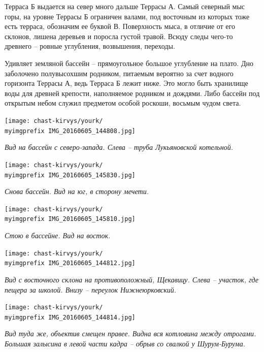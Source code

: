 Терраса Б выдается на север много дальше Террасы А. Самый северный мыс горы, на уровне Террасы Б ограничен валами, под восточным из которых тоже есть терраса, обозначим ее буквой В. Поверхность мыса, в отличие от его склонов, лишена деревьев и поросла густой травой. Всюду следы чего-то древнего – ровные углубления, возвышения, переходы.

Удивляет земляной бассейн – прямоугольное большое углубление на плато. Дно заболочено полувысохшим родником, питаемым вероятно за счет водного горизонта Террасы А, ведь Терраса Б лежит ниже. Это могло быть хранилище воды для древней крепости, наполняемое родником и дождями. Либо бассейн под открытым небом служил предметом особой роскоши, восьмым чудом света. 

\begin{center}
\texttt{[image: chast-kirvys/yourk/\\myimgprefix IMG\_20160605\_144808.jpg]}

\textit{Вид на бассейн с северо-запада. Слева – труба Лукьяновской котельной.}
\end{center}

\begin{center}
\texttt{[image: chast-kirvys/yourk/\\myimgprefix IMG\_20160605\_145830.jpg]}

\textit{Снова бассейн. Вид на юг, в сторону мечети.}
\end{center}

\begin{center}
\texttt{[image: chast-kirvys/yourk/\\myimgprefix IMG\_20160605\_145810.jpg]}

\textit{Стою в бассейне. Вид на восток.}
\end{center}

\newpage

\begin{center}
\texttt{[image: chast-kirvys/yourk/\\myimgprefix IMG\_20160605\_144812.jpg]}

\textit{Вид с восточного склона на противоположный, Щекавицу. Слева – участок, где пещера за школой. Внизу – переулок Нижнеюрковский.}
\end{center}

\begin{center}
\texttt{[image: chast-kirvys/yourk/\\myimgprefix IMG\_20160605\_144814.jpg]}

\textit{Вид туда же, объектив смещен правее. Видна вся котловина между отрогами. Большая залысина в левой части кадра – обрыв со свалкой у Шурум-Бурума.}
\end{center}

